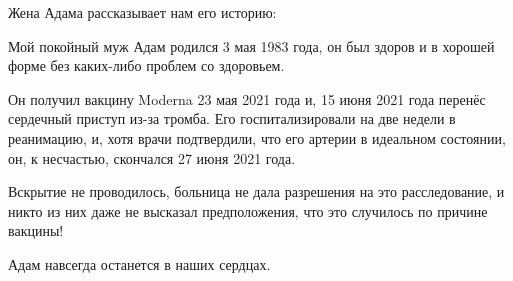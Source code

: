 Жена Адама рассказывает нам его историю:

Мой покойный муж Адам родился 3 мая 1983 года, он был здоров и в хорошей форме
без каких-либо проблем со здоровьем.

Он получил вакцину Moderna 23 мая 2021 года и, 15 июня 2021 года перенёс
сердечный приступ из-за тромба. Его госпитализировали на две недели в
реанимацию, и, хотя врачи подтвердили, что его артерии в идеальном состоянии,
он, к несчастью, скончался 27 июня 2021 года.

Вскрытие не проводилось, больница не дала разрешения на это расследование, и
никто из них даже не высказал предположения, что это случилось по причине
вакцины!

Адам навсегда останется в наших сердцах.
